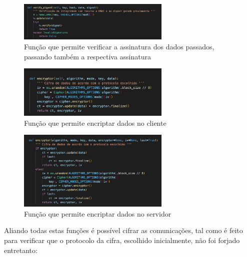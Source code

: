 \documentclass[10pt,english]{article}
\begin{document}
\begin{figure}[!h]
        \centering
        \includegraphics[width=275]{images/verify_digest.png}
        \caption{Função que permite verificar a assinatura dos dados passados, passando também a respectiva assinatura}
\end{figure}

\begin{figure}[!h]
        \centering
        \includegraphics[width=275]{images/encryptor_client.png}
        \caption{Função que permite encriptar dados no cliente}
\end{figure}

\begin{figure}[!h]
        \centering
        \includegraphics[width=275]{images/encryptor_server.png}
        \caption{Função que permite encriptar dados no servidor}
\end{figure}

\clearpage

\par Aliando todas estas funções é possível cifrar as comunicações, tal como é feito para verificar que o protocolo da cifra, escolhido inicialmente, não foi forjado entretanto:
\end{document}
